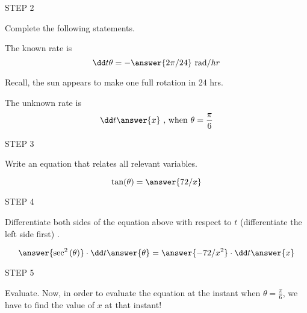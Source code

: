 \documentclass{ximera}
\begin{document}
\begin{exercise}
STEP 2

Complete the following statements.

The known rate is
 \[
\dd t \theta= - \answer{2\pi/24} \text{  rad}/hr
\]
\begin{hint}
Recall, the sun appears to make one full rotation in 24 hrs.
\end{hint}
The unknown rate is
\[
\dd t \answer{x} \text{    , when    } \theta=\frac{\pi}{6}
\]



STEP 3

Write an equation that relates  all relevant variables.


\[
\tan(\theta)=\answer{72/x} 
\]



STEP 4

Differentiate both sides of the equation above with respect to $t$ (differentiate the left side first)  .


\[
\answer{\sec^{2}{(\theta)}}\cdot \dd t \answer{\theta} =\answer{-72/x^{2}} \cdot \dd t \answer{x} 
\]



STEP 5

Evaluate.
Now, in order to evaluate the equation at the instant when $\theta=\frac{\pi}{6}$, we have to find the value of $x$ at that instant!



\end{exercise}
\end{document}
